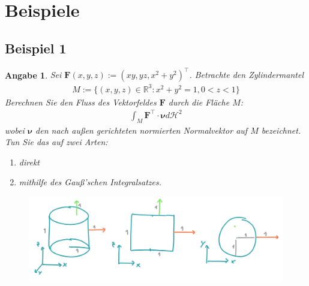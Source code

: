 \documentclass[]{article}
\newtheorem*{angabe*}{Angabe}
\begin{document}
\section{Beispiele}

\subsection*{Beispiel 1}
\begin{angabe*}
	Sei $\bm{F}(x,y,z) := (xy, yz, x^2+y^2)^\top$. Betrachte den Zylindermantel
	\begin{align*}
		M := \{(x,y,z) \in \mathbb{R}^3: x^2+y^2=1, 0<z<1\}
	\end{align*}
	Berechnen Sie den Fluss des Vektorfeldes $\mathbf{F}$ durch die Fläche $M$:
	\begin{align*}
		\int_M \bm{F}^\top \cdot \bm{\nu} d\mathcal{H}^2
	\end{align*}
	wobei $\bm{\nu}$ den nach außen gerichteten normierten Normalvektor auf $M$ bezeichnet.
	Tun Sie das auf zwei Arten:
	\begin{enumerate}[label=(\roman*)]
		\item direkt
		\item mithilfe des Gauß'schen Integralsatzes.
	\end{enumerate}
\end{angabe*}

\begin{figure}[h!]
	\includegraphics[width=\columnwidth]{bsp_1.png}
\end{figure}
\end{document}
